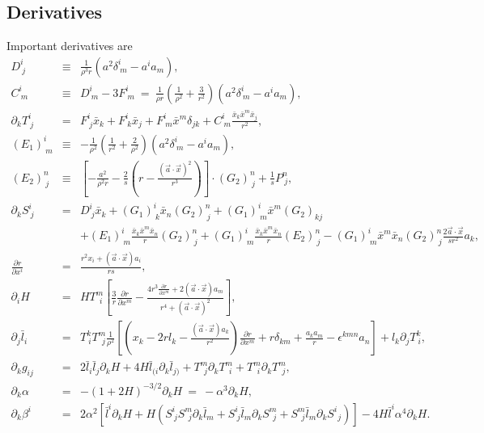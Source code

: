 \documentclass{article}
\begin{document}
\subsection{Derivatives}
Important derivatives are
\begin{eqnarray}
D^i_{\ j} &\equiv& \frac{1}{\rho^3 r}(a^2\delta^i_{\ m}-a^ia_m), \\
C^i_{\ m} &\equiv& D^i_{\ m}-3F^i_{\ m} \ =\  \frac{1}{\rho r} \left(\frac{1}{\rho^2}+\frac{3}{r^2}\right) (a^2\delta^i_{\ m}-a^ia_m), \\
\partial_{k}T^i_{\ j} &=& F^i_{\ j}\bar{x}_k+ F^i_{\ k}\bar{x}_j+ F^i_{\ m}\bar{x}^m \delta_{jk}+ C^i_{\ m} \frac{\bar{x}_k\bar{x}^m\bar{x}_j}{r^2}, \\
(E_1)^i_{\ m} &\equiv& -\frac{1}{\rho^2} \left(\frac{1}{r^2}+\frac{2}{\rho^2}\right) (a^2\delta^i_{\ m}-a^ia_m), \\
(E_2)^n_{\ j} &\equiv& \left[-\frac{a^2}{\rho^2 r}-\frac{2}{s}\left(r -\frac{(\vec{a}\cdot\vec{x})^2}{r^3}\right)\right] \cdot(G_2)^n_{\ j} + \frac{1}{s}P^n_{\ j}, \\
\partial_{k}S^i_{\ j} &=& D^i_{\ j}\bar{x}_k +(G_1)^i_{\ k}\bar{x}_n(G_2)^n_{\ j} +(G_1)^i_{\ m}\bar{x}^m(G_2)_{kj} \nonumber \\
&&+(E_1)^i_{\ m} \frac{\bar{x}_k\bar{x}^m\bar{x}_n}{r} (G_2)^n_{\ j} +(G_1)^i_{\ m} \frac{\bar{x}_k\bar{x}^m\bar{x}_n}{r} (E_2)^n_{\ j} -(G_1)^i_{\ m}\bar{x}^m\bar{x}_n(G_2)^n_{\ j}\frac{2\vec{a}\cdot\vec{x}}{sr^2}a_k, \\
\frac{\partial r}{\partial x^i} &=& \frac{r^2 x_i + (\vec{a}\cdot\vec{x}) a_i}{rs},\\
\partial_{i} H &=& 
HT^m_{\ \ i}\left[\frac{3}{r}\frac{\partial r}{\partial x^m} - \frac{4 r^3 \displaystyle\frac{\partial r}{\partial x^m} + 2(\vec{a}\cdot\vec{x})a_m}{r^4 + (\vec{a}\cdot\vec{x})^2}\right] , \\
\partial_{j} \bar{l}_i &=& T^k_{\ i} T^m_{\ \ j} \frac{1}{\rho^2} \left[ \left(x_k-2 r l_k-\frac{(\vec{a}\cdot\vec{x})a_k}{r^2}\right) \frac{\partial r}{\partial x^m}
+ r\delta_{km} + \frac{a_k a_m}{r} - \epsilon^{kmn} a_n \right]  +l_k \partial_{j}T^k_{\ i}, \\
\partial_{k}g_{i j} &=& 2 \bar{l}_i \bar{l}_j\partial_{k} H + 4 H \bar{l}_{(i} \partial_{k}\bar{l}_{j)} +T^m_{\ \ j}\partial_{k} T^m_{\ \ i} +T^m_{\ \ i}\partial_{k} T^m_{\ \ j}, \\
\partial_{k}\alpha &=& -(1+2 H)^{-3/2}\partial_{k}H \ = \ -\alpha^3\partial_{k}H,\\
\partial_{k}\beta^i &=& 2\alpha^2
\left[\bar{l}^i\partial_{k}H+H(S^i_{\ j}S^m_{\ \ j}\partial_{k}\bar{l}_m +S^i_{\ j}\bar{l}_m\partial_{k}S^m_{\ \ j}+S^m_{\ \ j}\bar{l}_m\partial_{k}S^i_{\ \ j})\right]
- 4 H \bar{l}^i \alpha^4\partial_{k}H.
\end{eqnarray}
\end{document}
